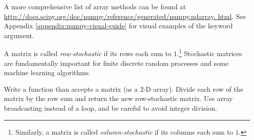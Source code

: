 A more comprehensive list of array methods can be found at
\url{http://docs.scipy.org/doc/numpy/reference/generated/numpy.ndarray.
html}.
See Appendix \ref{appendix:numpy-visual-guide} for visual examples of the  keyword argument.

\begin{problem} %
A matrix is called \emph{row-stochastic} if its rows each sum to $1$.\footnote{Similarly, a matrix is called \emph{column-stochastic} if its columns each sum to $1$.}
Stochastic matrices are fundamentally important for finite discrete random processes and some machine learning algorithms.

Write a function than accepts a matrix (as a 2-D array).
Divide each row of the matrix by the row sum and return the new row-stochastic matrix.
Use array broadcasting instead of a loop, and be careful to avoid integer division.
\end{problem}

